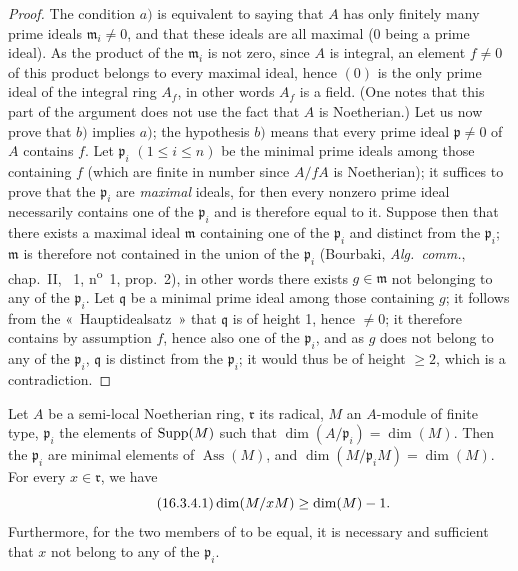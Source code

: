 \begin{proof}
The condition $a)$ is equivalent to saying that $A$ has only finitely many prime ideals $\mathfrak{m}_i\neq 0$, and that these ideals are all maximal (0 being a prime ideal).
As the product of the $\mathfrak{m}_i$ is not zero, since $A$ is integral, an element $f\neq 0$ of this product belongs to every maximal ideal, hence $(0)$ is the only prime ideal of the integral ring $A_f$, in other words $A_f$ is a field.
(One notes that this part of the argument does not use the fact that $A$ is Noetherian.)
Let us now prove that $b)$ implies $a)$; the hypothesis $b)$ means that every prime ideal $\mathfrak{p}\neq 0$ of $A$ contains $f$.
Let $\mathfrak{p}_i$ $(1\leq i\leq n)$ be the minimal prime ideals among those containing $f$ (which are finite in number since $A/f A$ is Noetherian); it suffices to prove that the $\mathfrak{p}_i$ are \emph{maximal} ideals, for then every nonzero prime ideal necessarily contains one of the $\mathfrak{p}_i$ and is therefore equal to it.
Suppose then that there exists a maximal ideal $\mathfrak{m}$ containing one of the $\mathfrak{p}_i$ and distinct from the $\mathfrak{p}_i$; $\mathfrak{m}$ is therefore not contained in the union of the $\mathfrak{p}_i$ (Bourbaki, \emph{Alg.~comm.}, chap.~II, \textsection~1, n\textsuperscript{o}~1, prop.~2), in other words there exists $g\in\mathfrak{m}$ not belonging to any of the $\mathfrak{p}_i$.
Let $\mathfrak{q}$ be a minimal prime ideal among those containing $g$; it follows from the «~Hauptidealsatz~»  that $\mathfrak{q}$ is of height 1, hence $\neq 0$; it therefore contains by assumption $f$, hence also one of the $\mathfrak{p}_i$, and as $g$ does not belong to any of the $\mathfrak{p}_i$, $\mathfrak{q}$ is distinct from the $\mathfrak{p}_i$; it would thus be of height $\geq 2$, which is a contradiction.
\end{proof}

\begin{proposition}[16.3.4]
\label{0.16.3.4}
Let $A$ be a semi-local Noetherian ring, $\mathfrak{r}$ its radical, $M$ an $A$-module of finite type, $\mathfrak{p}_i$ the elements of $\operatorname{Supp}(M)$ such that $\dim(A/\mathfrak{p}_i)=\dim(M)$.
Then the $\mathfrak{p}_i$ are minimal elements of $\operatorname{Ass}(M)$, and $\dim(M/\mathfrak{p}_i M)=\dim(M)$.
For every $x\in\mathfrak{r}$, we have
\begin{equation}
\label{0.16.3.4.1}
\tag{16.3.4.1}
  \dim(M/x M)\geq\dim(M)- 1.
\end{equation}
Furthermore, for the two members of  to be equal, it is necessary and sufficient that $x$ not belong to any of the $\mathfrak{p}_i$.
\end{proposition}

